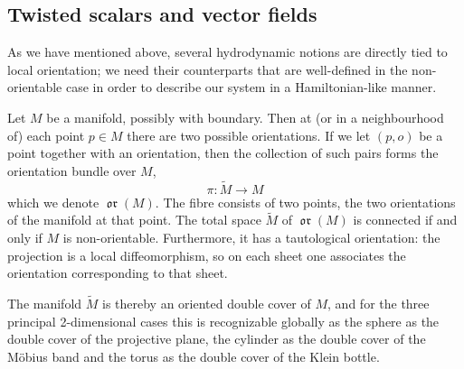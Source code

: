 \documentclass[11pt,twoside]{article}
\theoremstyle{definition}
\numberwithin{equation}{section}
\def\Mt{\widetilde{M}}
\def\ori{{\mathop\mathfrak{or}\nolimits}}
\begin{document}




\subsection{Twisted scalars and vector fields}
\label{sec: twisted definition}
As we have mentioned above, several hydrodynamic notions are directly tied to local orientation; we need their counterparts that are well-defined in the non-orientable case in order to describe our system in a Hamiltonian-like manner. 

Let $M$ be a manifold, possibly with boundary. Then at (or in a neighbourhood of) each point $p\in M$ there are two possible orientations. If we let $(p,o)$ be a point together with an orientation, then the collection of such pairs forms the orientation bundle over $M$, 
$$\pi:\Mt\to M$$
which we denote $\ori(M)$.  The fibre consists of two points, the two orientations of the manifold at that point. The total space $\Mt$ of $\ori(M)$ is connected if and only if $M$ is non-orientable. Furthermore, it has a tautological orientation:  the projection is a local diffeomorphism, so on each sheet one associates the orientation corresponding to that sheet. 

The manifold $\Mt$ is thereby an oriented double cover of $M$, and for the three principal 2-dimensional cases this is recognizable globally as the sphere as the double cover of the projective plane, the cylinder as the double cover of the M\"obius band and the torus as the double cover of the Klein bottle. 
\end{document}
